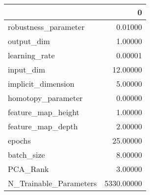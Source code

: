 \begin{tabular}{lr}
\toprule
{} &           0 \\
\midrule
robustness\_parameter   &     0.01000 \\
output\_dim             &     1.00000 \\
learning\_rate          &     0.00001 \\
input\_dim              &    12.00000 \\
implicit\_dimension     &     5.00000 \\
homotopy\_parameter     &     0.00000 \\
feature\_map\_height     &     1.00000 \\
feature\_map\_depth      &     2.00000 \\
epochs                 &    25.00000 \\
batch\_size             &     8.00000 \\
PCA\_Rank               &     3.00000 \\
N\_Trainable\_Parameters &  5330.00000 \\
\bottomrule
\end{tabular}
